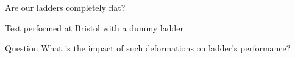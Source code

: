 \documentclass{beamer}
\begin{document}
\begin{frame}
\begin{block}{Are our ladders completely flat?}
      \begin{center}

        \footnotesize{Test performed at Bristol with a dummy ladder}
      \end{center}

    \end{block}
    
    \begin{alertblock}{Question}
      What is the impact of such deformations on ladder's performance?
    \end{alertblock}
  \end{frame}

\end{document}
